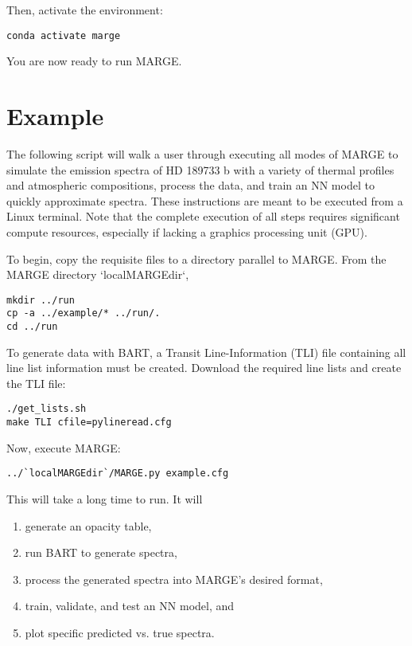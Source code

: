 \documentclass[letterpaper, 12pt]{article}
\begin{document}
\noindent Then, activate the environment:

\begin{verbatim}
conda activate marge
\end{verbatim}

\noindent You are now ready to run MARGE.


\section{Example}
\label{sec:example}

\noindent The following script will walk a user through executing all modes of MARGE 
to simulate the emission spectra of HD 189733 b with a variety of thermal 
profiles and atmospheric compositions, process the data, and train an NN 
model to quickly approximate spectra.  These instructions are meant to be 
executed from a Linux terminal.  Note that the complete execution of all steps 
requires significant compute resources, especially if lacking a graphics 
processing unit (GPU).

\noindent To begin, copy the requisite files to a directory parallel to MARGE.  From 
the MARGE directory `localMARGEdir`,

\begin{verbatim}
mkdir ../run
cp -a ../example/* ../run/.
cd ../run
\end{verbatim}

\noindent To generate data with BART, a Transit Line-Information (TLI) file containing 
all line list information must be created.  Download the required line lists 
and create the TLI file:

\begin{verbatim}
./get_lists.sh
make TLI cfile=pylineread.cfg
\end{verbatim}

\noindent Now, execute MARGE:

\begin{verbatim}
../`localMARGEdir`/MARGE.py example.cfg
\end{verbatim}

\noindent This will take a long time to run.  It will 

\begin{enumerate}
\item generate an opacity table,
\item run BART to generate spectra,
\item process the generated spectra into MARGE's desired format,
\item train, validate, and test an NN model, and
\item plot specific predicted vs. true spectra.
\end{enumerate}
\end{document}
